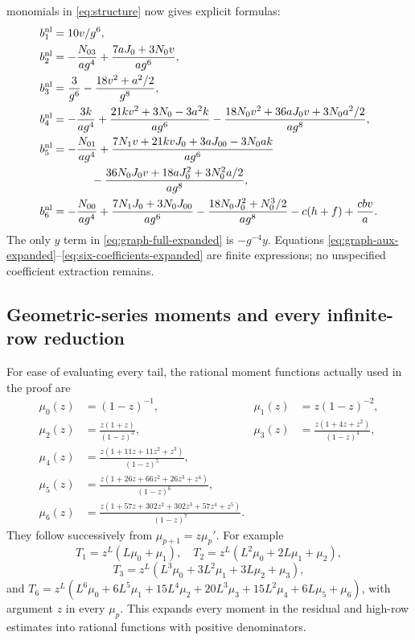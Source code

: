 monomials in \eqref{eq:structure} now gives explicit formulas:
\begin{align}
 b_1^{\rm nl}&=10v/g^6,\nonumber\\
 b_2^{\rm nl}&=-\frac{N_{03}}{ag^4}
                    +\frac{7aJ_0+3N_0v}{ag^6},\nonumber\\
 b_3^{\rm nl}&=\frac3{g^6}-\frac{18v^2+a^2/2}{g^8},\nonumber\\
 b_4^{\rm nl}&=-\frac{3k}{ag^4}
 +\frac{21kv^2+3N_0-3a^2k}{ag^6}
 -\frac{18N_0v^2+36aJ_0v+3N_0a^2/2}{ag^8},\nonumber\\
 b_5^{\rm nl}&=-\frac{N_{01}}{ag^4}
 +\frac{7N_1v+21kvJ_0+3aJ_{00}-3N_0ak}{ag^6}\nonumber\\
 &\hspace{12mm}-\frac{36N_0J_0v+18aJ_0^2+3N_0^2a/2}{ag^8},\nonumber\\
 b_6^{\rm nl}&=-\frac{N_{00}}{ag^4}
 +\frac{7N_1J_0+3N_0J_{00}}{ag^6}
 -\frac{18N_0J_0^2+N_0^3/2}{ag^8}-c(h+f)+\frac{cbv}{a}.
 \label{eq:six-coefficients-expanded}
\end{align}
The only $y$ term in \eqref{eq:graph-full-expanded} is $-g^{-4}y$.
Equations \eqref{eq:graph-aux-expanded}--\eqref{eq:six-coefficients-expanded}
are finite expressions; no unspecified coefficient extraction remains.

\subsection{Geometric-series moments and every infinite-row reduction}
For ease of evaluating every tail, the rational moment functions actually
used in the proof are
\begin{equation}\label{eq:moments-expanded}
\begin{aligned}
 \mu_0(z)&=(1-z)^{-1},&\mu_1(z)&=z(1-z)^{-2},\\
 \mu_2(z)&=\frac{z(1+z)}{(1-z)^3},&
 \mu_3(z)&=\frac{z(1+4z+z^2)}{(1-z)^4},\\
 \mu_4(z)&=\frac{z(1+11z+11z^2+z^3)}{(1-z)^5},\\
 \mu_5(z)&=\frac{z(1+26z+66z^2+26z^3+z^4)}{(1-z)^6},\\
 \mu_6(z)&=\frac{z(1+57z+302z^2+302z^3+57z^4+z^5)}{(1-z)^7}.
\end{aligned}
\end{equation}
They follow successively from $\mu_{p+1}=z\mu_p'$.
For example
\[
 T_1=z^L(L\mu_0+\mu_1),\quad
 T_2=z^L(L^2\mu_0+2L\mu_1+\mu_2),
\]
\[
 T_3=z^L(L^3\mu_0+3L^2\mu_1+3L\mu_2+\mu_3),
\]
and $T_6=z^L(L^6\mu_0+6L^5\mu_1+15L^4\mu_2+20L^3\mu_3
+15L^2\mu_4+6L\mu_5+\mu_6)$, with argument $z$ in every $\mu_p$.
This expands every moment in the residual and high-row estimates into rational
functions with positive denominators.

